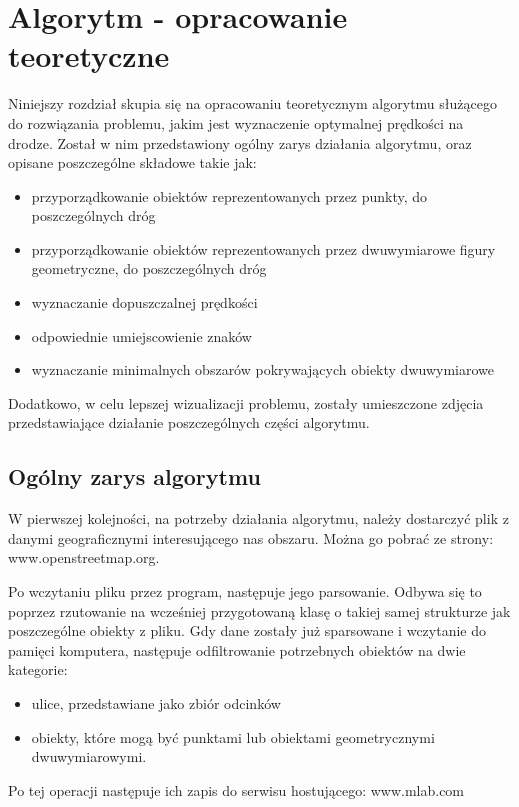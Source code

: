 \chapter{Algorytm - opracowanie teoretyczne}
\label{cha:AlgorytmTeoria}

Niniejszy rozdział skupia się na opracowaniu teoretycznym algorytmu służącego do rozwiązania problemu, jakim jest wyznaczenie optymalnej prędkości na drodze. Został w nim przedstawiony ogólny zarys działania algorytmu, oraz opisane poszczególne składowe takie jak:
\begin{itemize}
\item przyporządkowanie obiektów reprezentowanych przez punkty, do poszczególnych dróg
\item przyporządkowanie obiektów reprezentowanych przez dwuwymiarowe figury geometryczne, do poszczególnych dróg
\item wyznaczanie dopuszczalnej prędkości
\item odpowiednie umiejscowienie znaków
\item wyznaczanie minimalnych obszarów pokrywających obiekty dwuwymiarowe
\end{itemize}

Dodatkowo, w celu lepszej wizualizacji problemu, zostały umieszczone zdjęcia przedstawiające działanie poszczególnych części algorytmu.

\section{Ogólny zarys algorytmu}
\label{cha:ogolnyzarys}

W pierwszej kolejności, na potrzeby działania algorytmu, należy dostarczyć plik z danymi geograficznymi interesującego nas obszaru. Można go pobrać ze strony: www.openstreetmap.org.  

Po wczytaniu pliku przez program, następuje jego parsowanie. Odbywa się to poprzez rzutowanie na wcześniej przygotowaną klasę o takiej samej strukturze jak poszczególne obiekty z pliku. Gdy dane zostały już sparsowane i wczytanie do pamięci komputera, następuje odfiltrowanie potrzebnych obiektów na dwie kategorie:
\begin{itemize}
\item ulice, przedstawiane jako zbiór odcinków
\item obiekty, które mogą być punktami lub obiektami geometrycznymi dwuwymiarowymi.
\end{itemize}
Po tej operacji następuje ich zapis do serwisu hostującego: www.mlab.com



